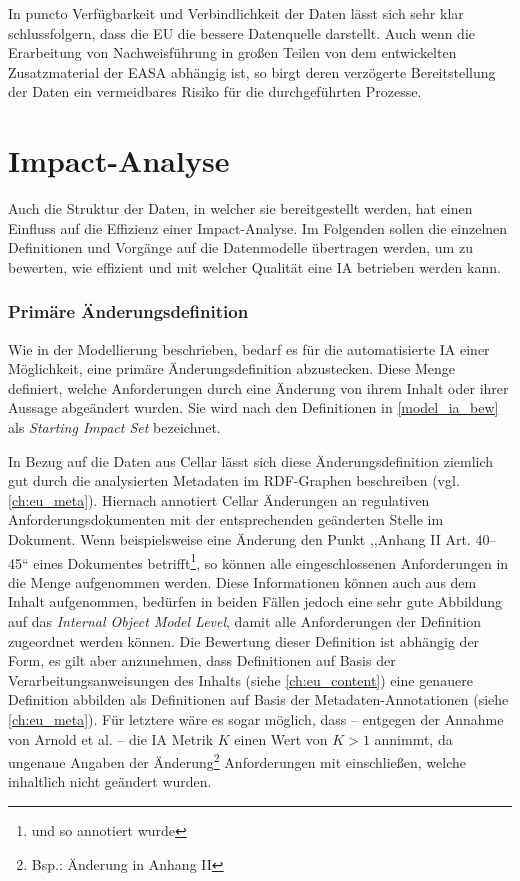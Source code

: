     \medskip
    In puncto Verfügbarkeit und Verbindlichkeit der Daten lässt sich sehr klar schlussfolgern, dass die \ac{EU} die bessere Datenquelle darstellt.
    Auch wenn die Erarbeitung von Nachweisführung in großen Teilen von dem entwickelten Zusatzmaterial der \ac{EASA} abhängig ist, so birgt deren verzögerte Bereitstellung der Daten ein vermeidbares Risiko für die durchgeführten Prozesse.
    
\pagebreak
\section{Impact-Analyse}
    
    Auch die Struktur der Daten, in welcher sie bereitgestellt werden, hat einen Einfluss auf die Effizienz einer Impact-Analyse.
    Im Folgenden sollen die einzelnen Definitionen und Vorgänge auf die Datenmodelle übertragen werden, um zu bewerten, wie effizient und mit welcher Qualität eine \ac{IA} betrieben werden kann.
    
\subsubsection{Primäre Änderungsdefinition}

    Wie in der Modellierung beschrieben, bedarf es für die automatisierte \ac{IA} einer Möglichkeit, eine primäre Änderungsdefinition abzustecken. 
    Diese Menge definiert, welche Anforderungen durch eine Änderung von ihrem Inhalt oder ihrer Aussage abgeändert wurden.
    Sie wird nach den Definitionen in \ref{model_ia_bew}  als \textit{Starting Impact Set}  bezeichnet.
    
    \medskip
    In Bezug auf die Daten aus Cellar lässt sich diese Änderungsdefinition ziemlich gut durch die analysierten Metadaten im \ac{RDF}-Graphen beschreiben (vgl. \ref{ch:eu_meta}).
    Hiernach annotiert Cellar Änderungen an regulativen Anforderungsdokumenten mit der entsprechenden geänderten Stelle im Dokument.
    Wenn beispielsweise eine Änderung den Punkt ,,Anhang II Art. 40--45`` eines Dokumentes betrifft\footnote{und so annotiert wurde}, so können alle eingeschlossenen Anforderungen in die Menge aufgenommen werden.
    Diese Informationen können auch aus dem Inhalt aufgenommen, bedürfen in beiden Fällen jedoch eine sehr gute Abbildung auf das \textit{Internal Object Model Level}, damit alle Anforderungen der Definition zugeordnet werden können.
    Die Bewertung dieser Definition ist abhängig der Form, es gilt aber anzunehmen, dass Definitionen auf Basis der Verarbeitungsanweisungen des Inhalts (siehe \ref{ch:eu_content}) eine genauere Definition abbilden als Definitionen auf Basis der Metadaten-Annotationen (siehe \ref{ch:eu_meta}). 
    Für letztere wäre es sogar möglich, dass -- entgegen der Annahme von Arnold et al. -- die \ac{IA} Metrik $K$ einen Wert von $K > 1$ annimmt, da ungenaue Angaben der Änderung\footnote{Bsp.: Änderung in Anhang II} Anforderungen mit einschließen, welche inhaltlich nicht geändert wurden. 
    
